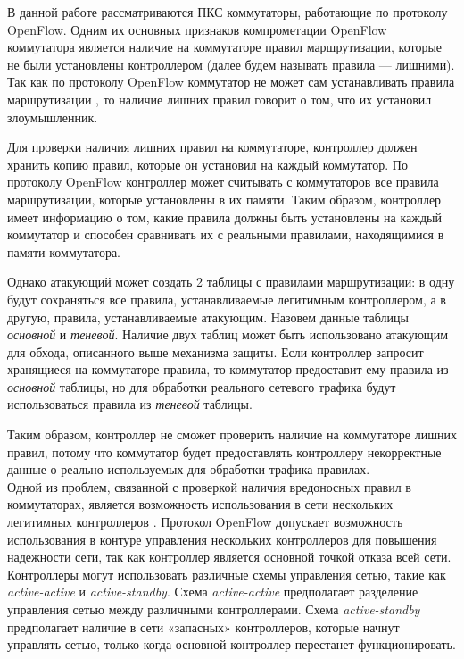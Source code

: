 \documentclass[../thesis.tex]{subfiles}
\begin{document}
В данной работе рассматриваются ПКС коммутаторы, работающие по протоколу OpenFlow.
Одним их основных признаков компрометации OpenFlow коммутатора является наличие на коммутаторе правил маршрутизации, которые не были установлены контроллером \cite{dhawan2015sphinx} (далее будем называть правила --- лишними).
Так как по протоколу OpenFlow коммутатор не может сам устанавливать правила маршрутизации \cite{openflow15}, то наличие лишних правил говорит о том, что их установил злоумышленник.

Для проверки наличия лишних правил на коммутаторе, контроллер должен хранить копию правил, которые он установил на каждый коммутатор.
По протоколу OpenFlow контроллер может считывать с коммутаторов все правила маршрутизации, которые установлены в их памяти.
Таким образом, контроллер имеет информацию о том, какие правила должны быть установлены на каждый коммутатор и способен сравнивать их с реальными правилами, находящимися в памяти коммутатора.

Однако атакующий может создать 2 таблицы с правилами маршрутизации: в одну будут сохраняться все правила, устанавливаемые легитимным контроллером, а в другую, правила, устанавливаемые атакующим. Назовем данные таблицы \textit{основной} и \textit{теневой}.
Наличие двух таблиц может быть использовано атакующим для обхода, описанного выше механизма защиты.
Если контроллер запросит хранящиеся на коммутаторе правила, то коммутатор предоставит ему правила из \textit{основной} таблицы, но для обработки реального сетевого трафика будут использоваться правила из \textit{теневой} таблицы.

Таким образом, контроллер не сможет проверить наличие на коммутаторе лишних правил, потому что коммутатор будет предоставлять контроллеру некорректные данные о реально используемых для обработки трафика правилах.
\\

Одной из проблем, связанной с проверкой наличия вредоносных правил в коммутаторах, является возможность использования в сети нескольких легитимных контроллеров \cite{dixit2013towards}.
Протокол OpenFlow допускает возможность использования в контуре управления нескольких контроллеров для повышения надежности сети, так как контроллер является основной точкой отказа всей сети.
Контроллеры могут использовать различные схемы управления сетью, такие как \textit{active-active} и \textit{active-standby}. Схема \textit{active-active} предполагает разделение управления сетью между различными контроллерами. Схема \textit{active-standby} предполагает наличие в сети «запасных» контроллеров, которые начнут управлять сетью, только когда основной контроллер перестанет функционировать.
\end{document}
